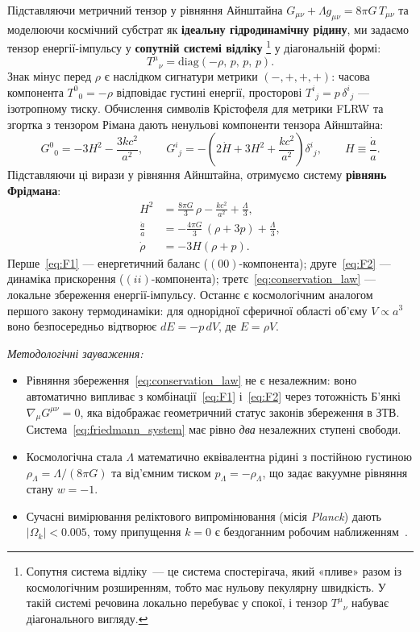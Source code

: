 Підставляючи метричний тензор у рівняння Айнштайна
$G_{\mu\nu} + \Lambda g_{\mu\nu} = 8\pi G\,T_{\mu\nu}$ та моделюючи космічний
субстрат як \textbf{ідеальну гідродинамічну рідину}, ми задаємо тензор
енергії-імпульсу у \textbf{сопутній системі відліку}%
\footnote{Сопутня система відліку~--- це система спостерігача, який
  «пливе» разом із космологічним розширенням, тобто має нульову пекулярну
  швидкість. У такій системі речовина локально перебуває у спокої, і
  тензор $T^{\mu}{}_\nu$ набуває діагонального вигляду.}
у діагональній формі:
\[
  T^\mu{}_\nu = \mathrm{diag}(-\rho,\,p,\,p,\,p).
\]
Знак мінус перед $\rho$ є наслідком сигнатури метрики $(-,+,+,+)$:
часова компонента $T^0{}_0 = -\rho$ відповідає густині енергії,
просторові $T^i{}_j = p\,\delta^i{}_j$ --- ізотропному тиску.
Обчислення символів Крістофеля для метрики FLRW та згортка з тензором
Рімана дають ненульові компоненти тензора Айнштайна:
\begin{equation*}
  G^0{}_0 = -3H^2 - \frac{3kc^2}{a^2},
  \qquad
  G^i{}_j = -\!\left(2\dot H + 3H^2 + \frac{kc^2}{a^2}\right)\delta^i{}_j,
  \qquad
  H \equiv \frac{\dot a}{a}.
\end{equation*}
Підставляючи ці вирази у рівняння Айнштайна, отримуємо систему
\textbf{рівнянь Фрідмана}:
\begin{subequations}\label{eq:friedmann_system}
\begin{align}
  H^2 &= \frac{8\pi G}{3}\,\rho - \frac{kc^2}{a^2} + \frac{\Lambda}{3},
  \label{eq:F1}\\[4pt]
  \frac{\ddot a}{a} &= -\frac{4\pi G}{3}\,(\rho + 3p) + \frac{\Lambda}{3},
  \label{eq:F2}\\[4pt]
  \dot\rho &= -3H(\rho + p).
  \label{eq:conservation_law}
\end{align}
\end{subequations}
Перше~\eqref{eq:F1} --- енергетичний баланс ($(00)$-компонента);
друге~\eqref{eq:F2} --- динаміка прискорення ($(ii)$-компонента);
третє~\eqref{eq:conservation_law} --- локальне збереження енергії-імпульсу.
Останнє є космологічним аналогом першого закону термодинаміки: для
однорідної сферичної області об'єму $V \propto a^3$ воно безпосередньо
відтворює $dE = -p\,dV$, де $E = \rho V$.

\medskip
\noindent\textit{Методологічні зауваження:}
\begin{itemize}
  \item Рівняння збереження~\eqref{eq:conservation_law} не є незалежним: воно автоматично випливає з комбінації~\eqref{eq:F1} і~\eqref{eq:F2} через тотожність Б'янкі $\nabla_\mu G^{\mu\nu} = 0$, яка відображає геометричний статус законів збереження в ЗТВ. Система~\eqref{eq:friedmann_system} має рівно \emph{два} незалежних ступені свободи.
  \item Космологічна стала $\Lambda$ математично еквівалентна рідині з постійною густиною $\rho_\Lambda = \Lambda/(8\pi G)$ та від'ємним тиском $p_\Lambda = -\rho_\Lambda$, що задає вакуумне рівняння стану $w = -1$.
  \item Сучасні вимірювання реліктового випромінювання (місія \textit{Planck}) дають $|\Omega_k| < 0.005$, тому припущення $k = 0$ є бездоганним робочим наближенням~\cite{planck_2018}.
\end{itemize}

